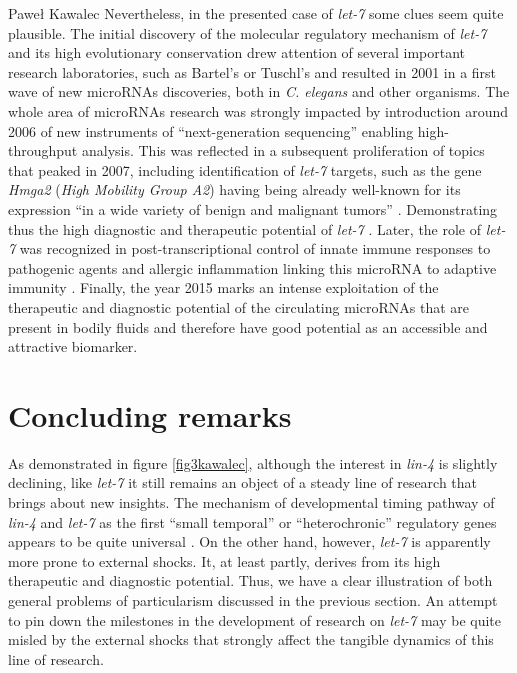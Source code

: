 \begin{artengenv}{Paweł Kawalec}
Nevertheless, in the presented case of \textit{let-7} some clues seem quite plausible. The initial discovery of the molecular regulatory mechanism of \textit{let-7} and its high evolutionary conservation
\parencite[][]{nelson_trans-splicing_2019} %
 drew attention of several important research laboratories, such as Bartel's or Tuschl's and resulted in 2001 in a first wave of new microRNAs discoveries, both in \textit{C. elegans} and other organisms. The whole area of microRNAs research was strongly impacted by introduction around 2006 of new instruments of ``next-generation sequencing'' enabling high-throughput analysis. This was reflected in a subsequent proliferation of topics that peaked in 2007, including identification of \textit{let-7} targets, such as the gene \textit{Hmga2} (\textit{High Mobility Group A2}) having being already well-known for its expression ``in a wide variety of benign and malignant tumors'' 
\parencite[][p.1576]{mayr_disrupting_2007}. %
 Demonstrating thus the high diagnostic and therapeutic potential of \textit{let-7} 
\parencites[][]{johnson_let-7_2007}[][]{kuehbacher_role_2007}[][]{park_let-7_2007}[][]{cinkornpumin_small_2017}[][]{pobezinsky_lets_2018}[][]{roos_pharmacologic_2018}. %
 Later, the role of \textit{let-7} was recognized in post-transcriptional control of innate immune responses to pathogenic agents and allergic inflammation linking this microRNA to adaptive immunity 
\parencites[][]{schulte_analysis_2011}[][]{kumar_let-7_2011}. %
 Finally, the year 2015 marks an intense exploitation of the therapeutic and diagnostic potential of the circulating microRNAs that are present in bodily fluids and therefore have good potential as an accessible and attractive biomarker.

\section{Concluding remarks}
As demonstrated in figure \ref{fig3kawalec}, although the interest in \textit{lin-4} is slightly declining, like \textit{let-7} it still remains an object of a steady line of research that brings about new insights. The mechanism of developmental timing pathway of \textit{lin-4} and \textit{let-7} as the first ``small temporal'' or ``heterochronic'' regulatory genes appears to be quite universal
\parencite[][]{bracht_regulation_2010}. %
 On the other hand, however, \textit{let-7} is apparently more prone to external shocks. It, at least partly, derives from its high therapeutic and diagnostic potential. Thus, we have a clear illustration of both general problems of particularism discussed in the previous section. An attempt to pin down the milestones in the development of research on \textit{let-7} may be quite misled by the external shocks that strongly affect the tangible dynamics of this line of research.


\end{artengenv}
